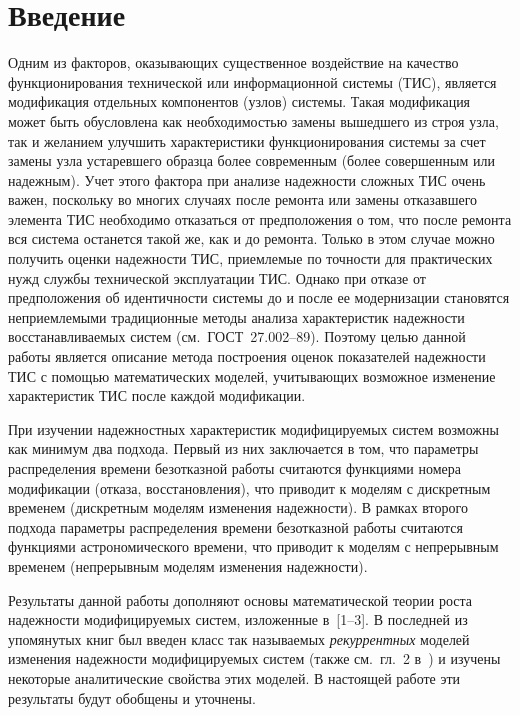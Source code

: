       \begin{multicols}{2}

      \label{st\stat}

\section{Введение}

Одним из факторов, оказывающих существенное воздействие на
качество функционирования технической или информационной системы
(ТИС), является модификация отдельных компонентов (узлов) системы.
Такая модификация может быть обусловлена как необходимостью замены
вышедшего из строя узла, так и желанием улучшить характеристики
функционирования системы за счет замены узла устаревшего образца
более современным (более совершенным или надежным). Учет этого
фактора при анализе надежности сложных ТИС очень важен, поскольку во многих случаях
после ремонта или замены отказавшего элемента ТИС необходимо
отказаться от предположения о том, что после ремонта вся система
останется такой же, как и до ремонта. Только в этом случае можно
получить оценки надежности ТИС, приемлемые по точ\-ности для
практических нужд службы технической эксплуатации ТИС. Однако при
отказе от предположения об идентичности системы до и после ее
модернизации становятся неприемлемыми традиционные методы анализа
характеристик надежности восстанавливаемых систем (см.\
ГОСТ~27.002--89). Поэтому целью данной работы является описание метода
построения оценок показателей надежности ТИС с помощью
математических моделей, учитывающих возможное изменение
характеристик ТИС после каждой модификации.
{

}

%

При изучении надежностных характеристик модифицируемых систем
возможны как минимум два подхода. Первый из них заключается в том,
что параметры распределения времени безотказной работы считаются
функциями номера модификации (отказа, восстановления), что
приводит к моделям с дискретным временем (дискретным моделям
изменения надежности). В рамках второго подхода параметры
распределения времени безотказной работы считаются функциями
астрономического времени, что приводит к моделям с непрерывным
временем (непрерывным моделям изменения надежности).

Результаты данной работы дополняют основы математической теории
роста надежности модифицируемых систем, изложенные в~[1--3].
В последней из упомянутых книг был введен класс так на\-зы\-ва\-емых
{\it рекуррентных} моделей изменения надежности модифицируемых
систем (также см.\ гл.~2 в~\cite{4art}) %
и изучены некоторые аналитические свойства этих моделей. В
настоящей работе эти результаты будут обобщены и уточнены.


\end{multicols}

